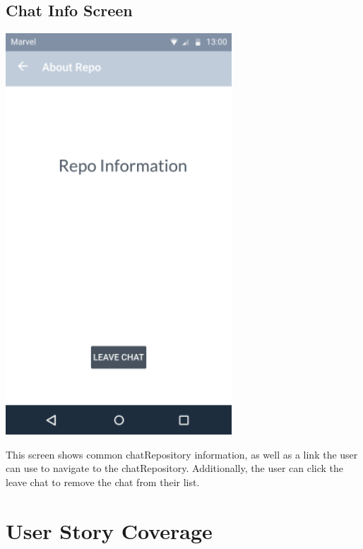 \documentclass{report}
\begin{document}
\subsection{Chat Info Screen}
\begin{center}
    \includegraphics[scale=0.5]{design-chat-info}
\end{center}
This screen shows common chatRepository information, as well as a link the user can use to navigate to the chatRepository. Additionally, the user can click the leave chat to remove the chat from their list.

\newpage
\section{User Story Coverage}
\end{document}
